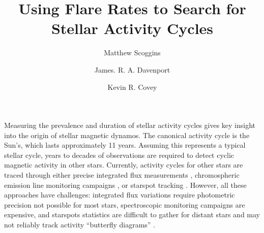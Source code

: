 \documentclass[RNAAS, modern]{aastex62}
\begin{document}
\title{Using Flare Rates to Search for Stellar Activity Cycles}



\author{Matthew Scoggins}

\author{James. R. A. Davenport}

\author{Kevin R. Covey}



\section{} 



Measuring the prevalence and duration of stellar activity cycles gives key insight into the origin of stellar magnetic dynamos. The canonical activity cycle is the Sun's, which lasts approximately 11 years. Assuming this represents a typical stellar cycle, years to decades of observations are required to detect cyclic magnetic activity in other stars. Currently, activity cycles for other stars are traced through either precise integrated flux measurements \citep{kopp2016}, chromospheric emission line monitoring campaigns \citep{duncan1991}, or starspot tracking \citep{messina2002,montet2017}. However, all these approaches have challenges: integrated flux variations require photometric precision not possible for most stars, spectroscopic monitoring campaigns are expensive, and starspots statistics are difficult to gather for distant stars and may not reliably track activity ``butterfly diagrams'' \citep{morris2019}.
\end{document}

